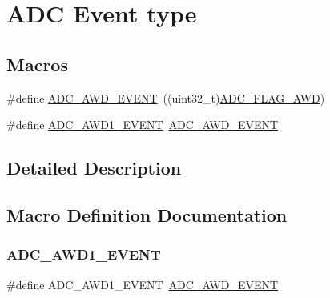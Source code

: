 \hypertarget{group___a_d_c___event__type}{}\section{A\+DC Event type}
\label{group___a_d_c___event__type}
\subsection*{Macros}
\begin{DoxyCompactItemize}
\item 
\#define \hyperlink{group___a_d_c___event__type_ga2d1d545ea1bfecba7a7081be6ef2cb93}{A\+D\+C\+\_\+\+A\+W\+D\+\_\+\+E\+V\+E\+NT}~((uint32\+\_\+t)\hyperlink{group___a_d_c__flags__definition_gadb75a4b430fb84950232b7a8f3a6a877}{A\+D\+C\+\_\+\+F\+L\+A\+G\+\_\+\+A\+WD})
\item 
\#define \hyperlink{group___a_d_c___event__type_ga0e6a24521d8bdc762fd916fb48c45475}{A\+D\+C\+\_\+\+A\+W\+D1\+\_\+\+E\+V\+E\+NT}~\hyperlink{group___a_d_c___event__type_ga2d1d545ea1bfecba7a7081be6ef2cb93}{A\+D\+C\+\_\+\+A\+W\+D\+\_\+\+E\+V\+E\+NT}
\end{DoxyCompactItemize}


\subsection{Detailed Description}


\subsection{Macro Definition Documentation}
\mbox{\label{group___a_d_c___event__type_ga0e6a24521d8bdc762fd916fb48c45475}} 
\subsubsection{\texorpdfstring{A\+D\+C\+\_\+\+A\+W\+D1\+\_\+\+E\+V\+E\+NT}{ADC\_AWD1\_EVENT}}
{\footnotesize\ttfamily \#define A\+D\+C\+\_\+\+A\+W\+D1\+\_\+\+E\+V\+E\+NT~\hyperlink{group___a_d_c___event__type_ga2d1d545ea1bfecba7a7081be6ef2cb93}{A\+D\+C\+\_\+\+A\+W\+D\+\_\+\+E\+V\+E\+NT}}

